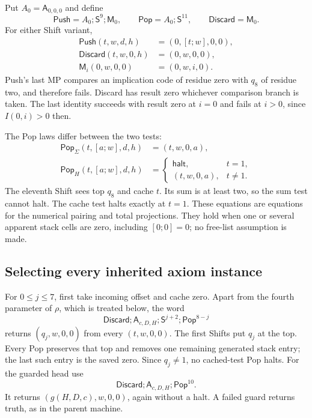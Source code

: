 Put $A_0=\mathsf A_{0,0,0}$ and define
\[
 \mathsf{Push}=A_0;\mathsf S^9;\mathsf M_0,\qquad
 \mathsf{Pop}=A_0;\mathsf S^{11},\qquad
 \mathsf{Discard}=\mathsf M_0.
\]
For either Shift variant,
\begin{align*}
 \mathsf{Push}(t,w,d,h)&=(0,[t;w],0,0),\\
 \mathsf{Discard}(t,w,0,h)&=(0,w,0,0),\\
 \mathsf M_i(0,w,0,0)&=(0,w,i,0).
\end{align*}
Push's last MP compares an implication code of residue zero with $q_8$
of residue two, and therefore fails.  Discard has result zero whichever
comparison branch is taken.  The last identity succeeds with result zero
at $i=0$ and fails at $i>0$, since $I(0,i)>0$ then.

The Pop laws differ between the two tests:
\begin{align*}
 \mathsf{Pop}_\Sigma(t,[a;w],d,h)&=(t,w,0,a),\\
 \mathsf{Pop}_H(t,[a;w],d,h)&=
   \begin{cases}\mathsf{halt},&t=1,\\(t,w,0,a),&t\ne1.
   \end{cases}                                         \tag{GD-Pop}\label{eq:gd-pop}
\end{align*}
The eleventh Shift sees top $q_8$ and cache $t$.  Its sum is at least two,
so the sum test cannot halt.  The cache test halts exactly at $t=1$.
These equations are equations for the numerical pairing and total
projections.  They hold when one or several apparent stack cells are
zero, including $[0;0]=0$; no free-list assumption is made.

\subsection{Selecting every inherited axiom instance}

For $0\le j\le7$, first take incoming offset and cache zero.  Apart
from the fourth parameter of $\rho$, which is treated below, the word
\[
 \mathsf{Discard};\mathsf A_{c,D,H};
             \mathsf S^{j+2};\mathsf{Pop}^{8-j}           \tag{GD-Sel}\label{eq:gd-sel}
\]
returns $(q_j,w,0,0)$ from every $(t,w,0,0)$.  The first Shifts put
$q_j$ at the top.  Every Pop preserves that top and removes one remaining
generated stack entry; the last such entry is the saved zero.
Since $q_j\ne1$, no cached-test Pop halts.  For the guarded head use
\[
 \mathsf{Discard};\mathsf A_{c,D,H};\mathsf{Pop}^{10}.
\]
It returns $(g(H,D,c),w,0,0)$, again without a halt.  A failed guard
returns truth, as in the parent machine.


